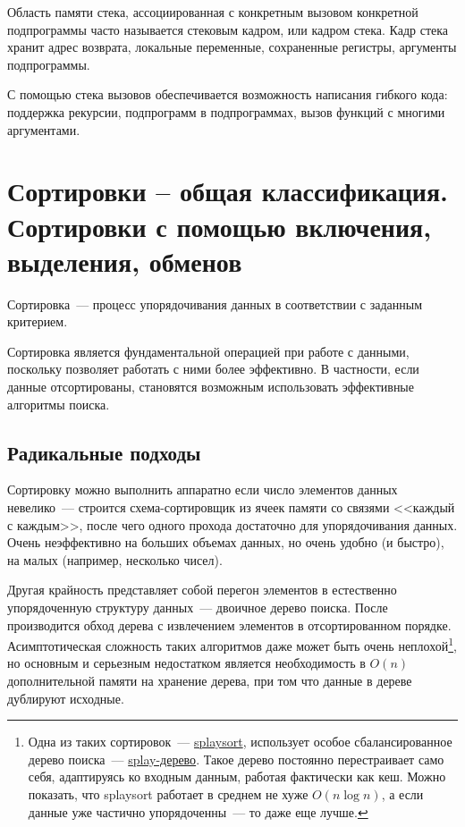 Область памяти стека, ассоциированная с конкретным вызовом конкретной подпрограммы часто называется стековым кадром, или кадром стека.
Кадр стека хранит адрес возврата, локальные переменные, сохраненные регистры, аргументы подпрограммы.

С помощью стека вызовов обеспечивается возможность написания гибкого кода: поддержка рекурсии, подпрограмм в подпрограммах, вызов функций
с многими аргументами.

%
%

\section{Сортировки – общая классификация. Сортировки с помощью включения, выделения, обменов}
Сортировка~--- процесс упорядочивания данных в соответствии с заданным критерием.

Сортировка является фундаментальной операцией при работе с данными, поскольку позволяет работать с ними более
эффективно. В частности, если данные отсортированы, становятся возможным использовать эффективные алгоритмы поиска.

\subsection{Радикальные подходы}
Сортировку можно выполнить аппаратно если число элементов данных невелико~--- строится схема-сортировщик из ячеек памяти
со связями <<каждый с каждым>>, после чего одного прохода достаточно для упорядочивания данных. Очень
неэффективно на больших объемах данных, но очень удобно (и быстро), на малых (например, несколько чисел).

Другая крайность представляет собой перегон элементов в естественно упорядоченную структуру данных~--- двоичное дерево поиска.
После производится обход дерева с извлечением элементов в отсортированном порядке.
Асимптотическая сложность таких алгоритмов даже может быть очень неплохой\footnote{
  Одна из таких сортировок~--- \href{https://en.wikipedia.org/wiki/Splaysort}{splaysort}, использует особое
  сбалансированное дерево поиска~--- \href{https://en.wikipedia.org/wiki/Splay_tree}{splay-дерево}. Такое дерево постоянно перестраивает
  само себя, адаптируясь ко входным данным, работая фактически как кеш. Можно показать, что splaysort работает в среднем не хуже
  \(O(n\log{n})\), а если данные уже частично упорядоченны~--- то даже еще лучше.
}, но основным и серьезным недостатком является
необходимость в \(O(n)\) дополнительной памяти на хранение дерева, при том что данные в дереве дублируют исходные.

